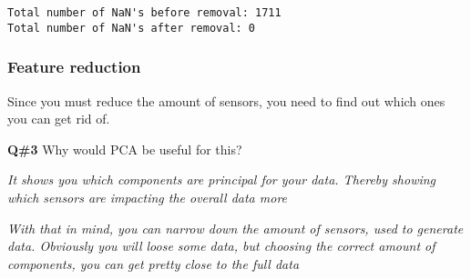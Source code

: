 \documentclass[11pt]{article}
\begin{document}
    \begin{Verbatim}[commandchars=\\\{\}]
Total number of NaN's before removal: 1711
Total number of NaN's after removal: 0

    \end{Verbatim}

    \subsubsection{Feature reduction}\label{feature-reduction}

Since you must reduce the amount of sensors, you need to find out which
ones you can get rid of.

    \textbf{Q\#3} Why would PCA be useful for this?

\emph{It shows you which components are principal for your data. Thereby
showing which sensors are impacting the overall data more}

\emph{With that in mind, you can narrow down the amount of sensors, used
to generate data. Obviously you will loose some data, but choosing the
correct amount of components, you can get pretty close to the full data}
\end{document}
